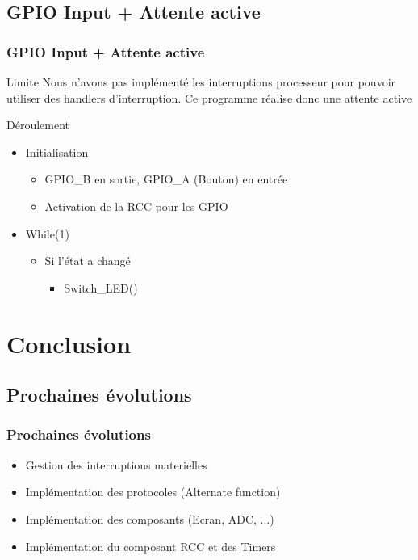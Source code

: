 \documentclass{beamer}
\begin{document}
		\subsection{GPIO Input + Attente active}
			\begin{frame}
				\frametitle{GPIO Input + Attente active}
				\begin{alertblock}{Limite}
					Nous n'avons pas implémenté les interruptions processeur pour pouvoir utiliser des handlers d'interruption.
					Ce programme réalise donc une attente active
				\end{alertblock}
				\begin{block}{ Déroulement }
					\begin{itemize}
						\item Initialisation
							\begin{itemize}
								\item GPIO\_B en sortie, GPIO\_A (Bouton) en entrée
								\item Activation de la RCC pour les GPIO
							\end{itemize}
						\item While(1)
							\begin{itemize}
								\item Si l'état a changé
									\begin{itemize}
										\item Switch\_LED()
									\end{itemize}
							\end{itemize}
					\end{itemize}
				\end{block}
			\end{frame}
	
	

	
	
	\section{Conclusion}
		\subsection{Prochaines évolutions}
			\begin{frame}
				\frametitle{Prochaines évolutions}
				\begin{itemize}
					\item Gestion des interruptions materielles
					\item Implémentation des protocoles (Alternate function)
					\item Implémentation des composants (Ecran, ADC, ...)
					\item Implémentation du composant RCC et des Timers
				\end{itemize}
			\end{frame}
		
\end{document}
